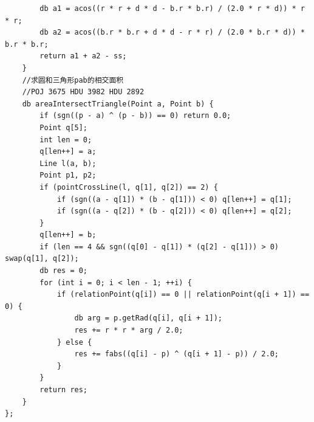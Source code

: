 \begin{lstlisting}
		db a1 = acos((r * r + d * d - b.r * b.r) / (2.0 * r * d)) * r * r;
		db a2 = acos((b.r * b.r + d * d - r * r) / (2.0 * b.r * d)) * b.r * b.r;
		return a1 + a2 - ss;	
	}
	//求圆和三角形pab的相交面积
	//POJ 3675 HDU 3982 HDU 2892
	db areaIntersectTriangle(Point a, Point b) {
		if (sgn((p - a) ^ (p - b)) == 0) return 0.0;
		Point q[5];
		int len = 0;
		q[len++] = a;
		Line l(a, b);
		Point p1, p2;
		if (pointCrossLine(l, q[1], q[2]) == 2) {
			if (sgn((a - q[1]) * (b - q[1])) < 0) q[len++] = q[1];
			if (sgn((a - q[2]) * (b - q[2])) < 0) q[len++] = q[2];
		}
		q[len++] = b;
		if (len == 4 && sgn((q[0] - q[1]) * (q[2] - q[1])) > 0) swap(q[1], q[2]);
		db res = 0;
		for (int i = 0; i < len - 1; ++i) {
			if (relationPoint(q[i]) == 0 || relationPoint(q[i + 1]) == 0) {
				db arg = p.getRad(q[i], q[i + 1]);
				res += r * r * arg / 2.0;
			} else {
				res += fabs((q[i] - p) ^ (q[i + 1] - p)) / 2.0;
			}
		}
		return res;
	}
};
\end{lstlisting}

